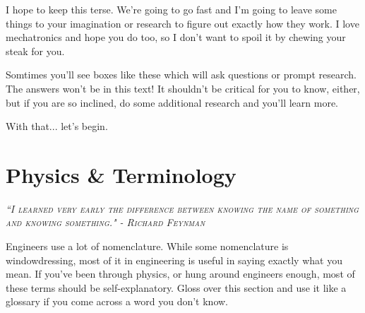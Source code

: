 I hope to keep this terse. We're going to go fast and I'm going to leave some things to your imagination or research to figure out exactly how they work. I love mechatronics and hope you do too, so I don't want to spoil it by chewing your steak for you.

\addvspace{2.0ex}
\begin{qbox}
	Somtimes you'll see boxes like these which will ask questions or prompt research. The answers won't be in this text! It shouldn't be critical for you to know, either, but if you are so inclined, do some additional research and you'll learn more.
\end{qbox}

With that... let's begin.

\chapter{Physics \& Terminology}
 
 {\slshape \scshape ``I learned very early the difference between knowing the name of something and knowing something." - Richard Feynman}

 Engineers use a lot of nomenclature. While some nomenclature is windowdressing, most of it in engineering is useful in saying exactly what you mean. If you've been through physics, or hung around engineers enough, most of these terms should be self-explanatory. Gloss over this section and use it like a glossary if you come across a word you don't know.

